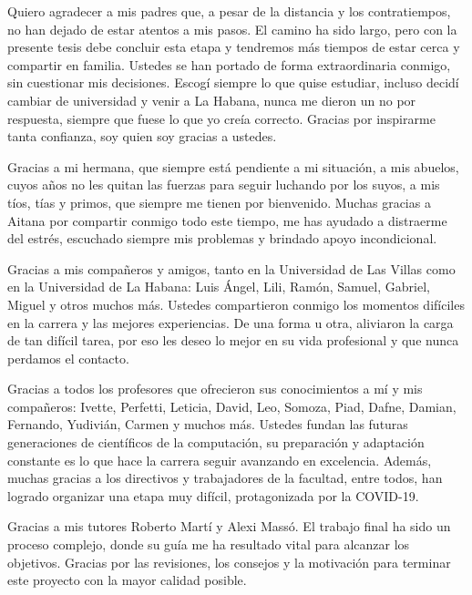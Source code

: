 \begin{acknowledgements}
Quiero agradecer a mis padres que, a pesar de la distancia y los contratiempos, no han dejado de estar atentos a mis pasos. El camino ha sido largo, pero con la presente tesis debe concluir esta etapa y tendremos más tiempos de estar cerca y compartir en familia. Ustedes se han portado de forma extraordinaria conmigo, sin cuestionar mis decisiones. Escogí siempre lo que quise estudiar, incluso decidí cambiar de universidad y venir a La Habana, nunca me dieron un no por respuesta, siempre que fuese lo que yo creía correcto. Gracias por inspirarme tanta confianza, soy quien soy gracias a ustedes.

Gracias a mi hermana, que siempre está pendiente a mi situación, a mis abuelos, cuyos años no les quitan las fuerzas para seguir luchando por los suyos, a mis tíos, tías y primos, que siempre me tienen por bienvenido. Muchas gracias a Aitana por compartir conmigo todo este tiempo, me has ayudado a distraerme del estrés, escuchado siempre mis problemas y brindado apoyo incondicional.

Gracias a mis compañeros y amigos, tanto en la Universidad de Las Villas como en la Universidad de La Habana: Luis Ángel, Lili, Ramón, Samuel, Gabriel, Miguel y otros muchos más. Ustedes compartieron conmigo los momentos difíciles en la carrera y las mejores experiencias. De una forma u otra, aliviaron la carga de tan difícil tarea,  por eso les deseo lo mejor en su vida profesional y que nunca perdamos el contacto.

Gracias a todos los profesores que ofrecieron sus conocimientos a mí y mis compañeros: Ivette, Perfetti, Leticia, David, Leo, Somoza, Piad, Dafne, Damian, Fernando, Yudivián, Carmen y muchos más. Ustedes fundan las futuras generaciones de científicos de la computación, su preparación y adaptación constante es lo que hace la carrera seguir avanzando en excelencia. Además, muchas gracias a los directivos y trabajadores de la facultad, entre todos, han logrado organizar una etapa muy difícil, protagonizada por la COVID-19.

Gracias a mis tutores Roberto Martí y Alexi Massó. El trabajo final ha sido un proceso complejo, donde su guía me ha resultado vital para alcanzar los objetivos. Gracias por las revisiones, los consejos y la motivación para terminar este proyecto con la mayor calidad posible.
\end{acknowledgements}